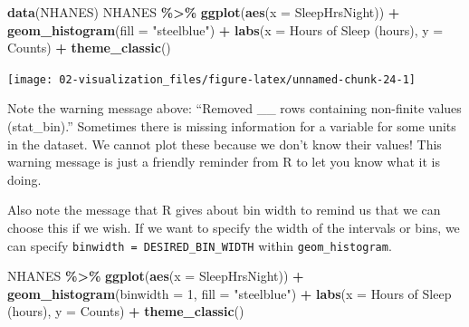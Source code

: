 \documentclass[
]{book}
\newenvironment{Shaded}{\begin{snugshade}}{\end{snugshade}}
\newcommand{\AttributeTok}[1]{\textcolor[rgb]{0.13,0.29,0.53}{#1}}
\newcommand{\DecValTok}[1]{\textcolor[rgb]{0.00,0.00,0.81}{#1}}
\newcommand{\FunctionTok}[1]{\textcolor[rgb]{0.13,0.29,0.53}{\textbf{#1}}}
\newcommand{\NormalTok}[1]{#1}
\newcommand{\SpecialCharTok}[1]{\textcolor[rgb]{0.81,0.36,0.00}{\textbf{#1}}}
\newcommand{\StringTok}[1]{\textcolor[rgb]{0.31,0.60,0.02}{#1}}
\begin{document}
\begin{Shaded}
\begin{Highlighting}[]
\FunctionTok{data}\NormalTok{(NHANES)}
\NormalTok{NHANES }\SpecialCharTok{\%\textgreater{}\%}
    \FunctionTok{ggplot}\NormalTok{(}\FunctionTok{aes}\NormalTok{(}\AttributeTok{x =}\NormalTok{ SleepHrsNight)) }\SpecialCharTok{+}
    \FunctionTok{geom\_histogram}\NormalTok{(}\AttributeTok{fill =} \StringTok{"steelblue"}\NormalTok{) }\SpecialCharTok{+} 
    \FunctionTok{labs}\NormalTok{(}\AttributeTok{x =} \StringTok{\textquotesingle{}Hours of Sleep (hours)\textquotesingle{}}\NormalTok{, }\AttributeTok{y =} \StringTok{\textquotesingle{}Counts\textquotesingle{}}\NormalTok{) }\SpecialCharTok{+} 
    \FunctionTok{theme\_classic}\NormalTok{() }
\end{Highlighting}
\end{Shaded}

\begin{center}\texttt{[image: 02-visualization\_files/figure-latex/unnamed-chunk-24-1]} \end{center}

Note the warning message above: ``Removed \_\_ rows containing non-finite values (stat\_bin).'' Sometimes there is missing information for a variable for some units in the dataset. We cannot plot these because we don't know their values! This warning message is just a friendly reminder from R to let you know what it is doing.

Also note the message that R gives about bin width to remind us that we can choose this if we wish. If we want to specify the width of the intervals or bins, we can specify \texttt{binwidth\ =\ DESIRED\_BIN\_WIDTH} within \texttt{geom\_histogram}.

\begin{Shaded}
\begin{Highlighting}[]
\NormalTok{NHANES }\SpecialCharTok{\%\textgreater{}\%}
    \FunctionTok{ggplot}\NormalTok{(}\FunctionTok{aes}\NormalTok{(}\AttributeTok{x =}\NormalTok{ SleepHrsNight)) }\SpecialCharTok{+}
    \FunctionTok{geom\_histogram}\NormalTok{(}\AttributeTok{binwidth =} \DecValTok{1}\NormalTok{, }\AttributeTok{fill =} \StringTok{"steelblue"}\NormalTok{) }\SpecialCharTok{+} 
    \FunctionTok{labs}\NormalTok{(}\AttributeTok{x =} \StringTok{\textquotesingle{}Hours of Sleep (hours)\textquotesingle{}}\NormalTok{, }\AttributeTok{y =} \StringTok{\textquotesingle{}Counts\textquotesingle{}}\NormalTok{) }\SpecialCharTok{+} 
    \FunctionTok{theme\_classic}\NormalTok{() }
\end{Highlighting}
\end{Shaded}
\end{document}
